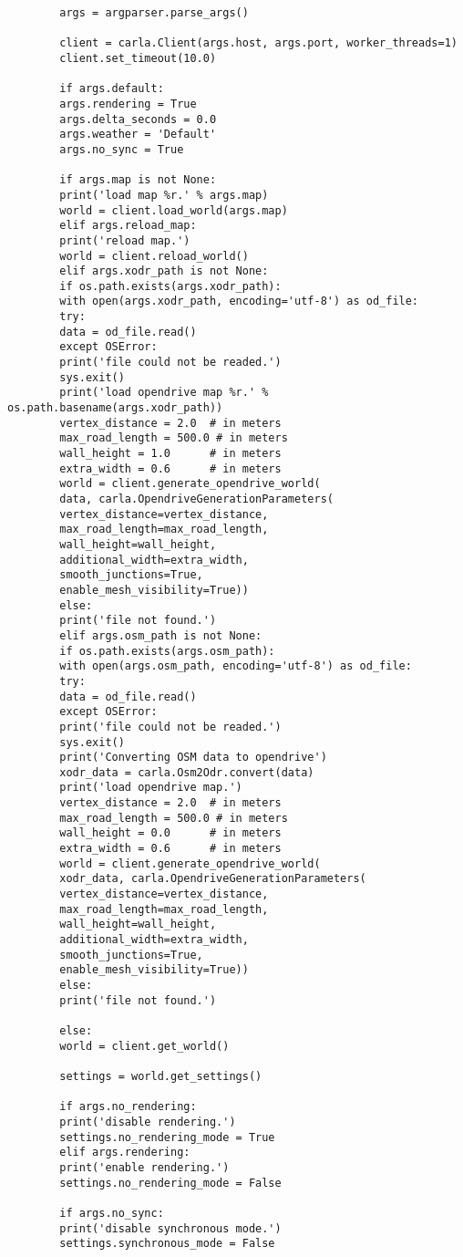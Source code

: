 \begin{enumerate}
\begin{verbatim}
		args = argparser.parse_args()
		
		client = carla.Client(args.host, args.port, worker_threads=1)
		client.set_timeout(10.0)
		
		if args.default:
		args.rendering = True
		args.delta_seconds = 0.0
		args.weather = 'Default'
		args.no_sync = True
		
		if args.map is not None:
		print('load map %r.' % args.map)
		world = client.load_world(args.map)
		elif args.reload_map:
		print('reload map.')
		world = client.reload_world()
		elif args.xodr_path is not None:
		if os.path.exists(args.xodr_path):
		with open(args.xodr_path, encoding='utf-8') as od_file:
		try:
		data = od_file.read()
		except OSError:
		print('file could not be readed.')
		sys.exit()
		print('load opendrive map %r.' % os.path.basename(args.xodr_path))
		vertex_distance = 2.0  # in meters
		max_road_length = 500.0 # in meters
		wall_height = 1.0      # in meters
		extra_width = 0.6      # in meters
		world = client.generate_opendrive_world(
		data, carla.OpendriveGenerationParameters(
		vertex_distance=vertex_distance,
		max_road_length=max_road_length,
		wall_height=wall_height,
		additional_width=extra_width,
		smooth_junctions=True,
		enable_mesh_visibility=True))
		else:
		print('file not found.')
		elif args.osm_path is not None:
		if os.path.exists(args.osm_path):
		with open(args.osm_path, encoding='utf-8') as od_file:
		try:
		data = od_file.read()
		except OSError:
		print('file could not be readed.')
		sys.exit()
		print('Converting OSM data to opendrive')
		xodr_data = carla.Osm2Odr.convert(data)
		print('load opendrive map.')
		vertex_distance = 2.0  # in meters
		max_road_length = 500.0 # in meters
		wall_height = 0.0      # in meters
		extra_width = 0.6      # in meters
		world = client.generate_opendrive_world(
		xodr_data, carla.OpendriveGenerationParameters(
		vertex_distance=vertex_distance,
		max_road_length=max_road_length,
		wall_height=wall_height,
		additional_width=extra_width,
		smooth_junctions=True,
		enable_mesh_visibility=True))
		else:
		print('file not found.')
		
		else:
		world = client.get_world()
		
		settings = world.get_settings()
		
		if args.no_rendering:
		print('disable rendering.')
		settings.no_rendering_mode = True
		elif args.rendering:
		print('enable rendering.')
		settings.no_rendering_mode = False
		
		if args.no_sync:
		print('disable synchronous mode.')
		settings.synchronous_mode = False
		

\end{verbatim}
\end{enumerate}
